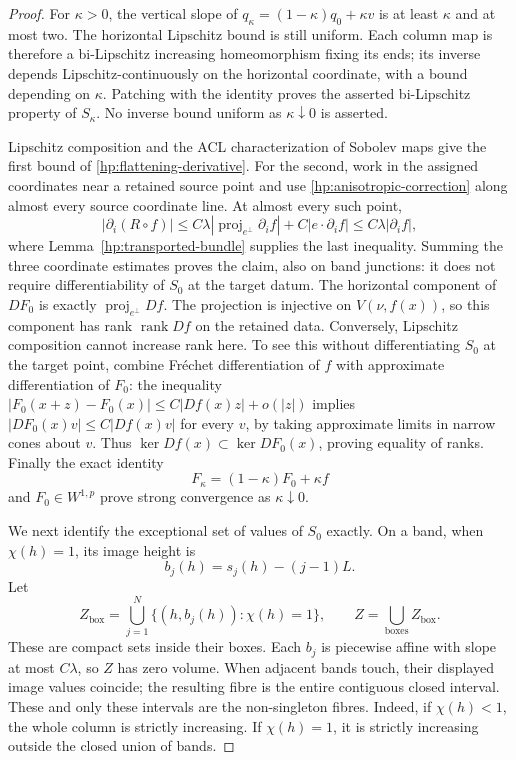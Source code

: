 \documentclass[11pt]{article}
\numberwithin{equation}{section}
\theoremstyle{definition}
\theoremstyle{remark}
\DeclareMathOperator{\rank}{rank}
\begin{document}
\begin{proof}
For $\kappa>0$, the vertical slope of
$q_\kappa=(1-\kappa)q_0+\kappa v$ is at least $\kappa$ and at most
two.  The horizontal Lipschitz bound is still uniform.  Each column
map is therefore a bi-Lipschitz increasing homeomorphism fixing its
ends; its inverse depends Lipschitz-continuously on the horizontal
coordinate, with a bound depending on $\kappa$.  Patching with the
identity proves the asserted bi-Lipschitz property of $S_\kappa$.
No inverse bound uniform as $\kappa\downarrow0$ is asserted.

Lipschitz composition and the ACL characterization of Sobolev maps
give the first bound of \eqref{hp:flattening-derivative}.  For the
second, work in the assigned coordinates near a retained source
point and use \eqref{hp:anisotropic-correction} along almost every
source coordinate line.  At almost every such point,
\[
 |\partial_i(R\circ f)|
 \le C\lambda|\operatorname{proj}_{e^\perp}\partial_i f|
       +C|e\cdot\partial_i f|
 \le C\lambda|\partial_i f|,
\]
where Lemma~\ref{hp:transported-bundle} supplies the last inequality.
Summing the three coordinate estimates proves the claim, also on
band junctions: it does not require differentiability of $S_0$ at
the target datum.  The horizontal component of $DF_0$ is exactly
$\operatorname{proj}_{e^\perp}Df$.  The projection is injective on
$V(\nu,f(x))$, so this component has rank $\rank Df$ on the
retained data.  Conversely, Lipschitz composition cannot increase
rank here.  To see this without differentiating $S_0$ at the target
point, combine Fr\'echet differentiation of $f$ with approximate
differentiation of $F_0$: the inequality
$|F_0(x+z)-F_0(x)|\le C|Df(x)z|+o(|z|)$ implies
$|DF_0(x)v|\le C|Df(x)v|$ for every $v$, by taking approximate
limits in narrow cones about $v$.  Thus
$\ker Df(x)\subset\ker DF_0(x)$, proving equality of ranks.
Finally the exact identity
\[
 F_\kappa=(1-\kappa)F_0+\kappa f
\]
and $F_0\in W^{1,p}$ prove strong convergence as $\kappa\downarrow0$.

We next identify the exceptional set of values of $S_0$ exactly.
On a band, when $\chi(h)=1$, its image height is
\[
 b_j(h)=s_j(h)-(j-1)L.
\]
Let
\begin{equation}\label{hp:collapsed-values}
 Z_{\mathrm{box}}=
   \bigcup_{j=1}^N\{(h,b_j(h)):\chi(h)=1\},
 \qquad Z=\bigcup_{\mathrm{boxes}}Z_{\mathrm{box}}.
\end{equation}
These are compact sets inside their boxes.  Each $b_j$ is piecewise
affine with slope at most $C\lambda$, so $Z$ has zero volume.
When adjacent bands touch, their displayed image values coincide;
the resulting fibre is the entire contiguous closed interval.
These and only these intervals are the non-singleton fibres.  Indeed,
if $\chi(h)<1$, the whole column is strictly increasing.  If
$\chi(h)=1$, it is strictly increasing outside the closed union of
bands.


\end{proof}
\end{document}
